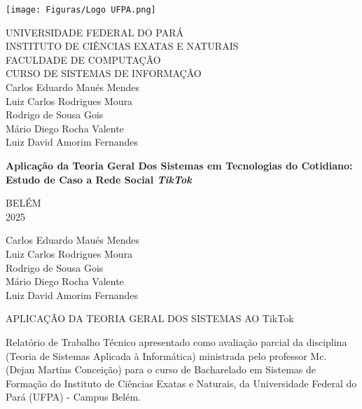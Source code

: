 
\begin{center}
    \thispagestyle{empty} %
    \texttt{[image: Figuras/Logo UFPA.png]}
    \onehalfspacing

    UNIVERSIDADE FEDERAL DO PARÁ \\
    INSTITUTO DE CIÊNCIAS EXATAS E NATURAIS \\
    FACULDADE DE COMPUTAÇÃO\\
    CURSO DE SISTEMAS DE INFORMAÇÃO \\
    
    \vspace{4cm}
    Carlos Eduardo Maués Mendes\\
    Luiz Carlos Rodrigues Moura\\
    Rodrigo de Sousa Gois\\
    Mário Diego Rocha Valente\\
    Luiz David Amorim Fernandes\\
    \vspace{5cm}
    
    \textbf{Aplicação da Teoria Geral Dos Sistemas em Tecnologias do Cotidiano: Estudo de Caso a Rede Social \textit{TikTok}}\\
    \vspace{5cm}
    
    BELÉM\\
    2025\\
    

    \newpage
    \setcounter{page}{1} %
    \thispagestyle{empty}
    
    Carlos Eduardo Maués Mendes\\
    Luiz Carlos Rodrigues Moura\\
    Rodrigo de Sousa Gois\\
    Mário Diego Rocha Valente\\
    Luiz David Amorim Fernandes\\
    \vspace{5cm}
    
    APLICAÇÃO DA TEORIA GERAL DOS SISTEMAS AO TikTok\\
    \vspace{5cm}
    
\end{center}

\singlespacing
\hspace{8cm} %
\begin{minipage}{7cm}
Relatório de Trabalho Técnico apresentado como avaliação parcial da disciplina (Teoria de Sistemas Aplicada à Informática) ministrada pelo professor Mc. (Dejan Martins Conceição) para o curso de Bacharelado em Sistemas de Formação do Instituto de Ciências Exatas e Naturais, da Universidade Federal do Pará (UFPA) - Campus Belém. 
\end{minipage}
\vspace{4cm}

